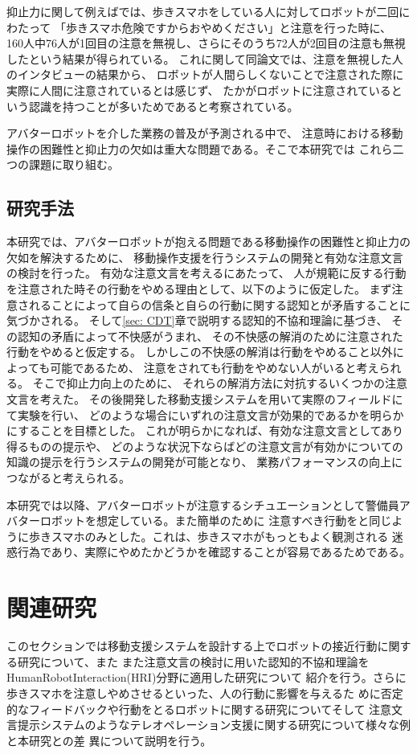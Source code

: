 \documentclass{kuisthesis}
\begin{document}
抑止力に関して例えば\cite{Schneider2022}では、歩きスマホをしている人に対してロボットが二回にわたって
「歩きスマホ危険ですからおやめください」と注意を行った時に、
160人中76人が1回目の注意を無視し、さらにそのうち72人が2回目の注意も無視したという結果が得られている。
これに関して同論文では、注意を無視した人のインタビューの結果から、
ロボットが人間らしくないことで注意された際に実際に人間に注意されているとは感じず、
たかがロボットに注意されているという認識を持つことが多いためであると考察されている。

アバターロボットを介した業務の普及が予測される中で、
注意時における移動操作の困難性と抑止力の欠如は重大な問題である。そこで本研究では
これら二つの課題に取り組む。


\subsection{研究手法}
\label{sec: 研究目的}
本研究では、アバターロボットが抱える問題である移動操作の困難性と抑止力の欠如を解決するために、
移動操作支援を行うシステムの開発と有効な注意文言の検討を行った。
有効な注意文言を考えるにあたって、
人が規範に反する行動を注意された時その行動をやめる理由として、以下のように仮定した。
まず注意されることによって自らの信条と自らの行動に関する認知とが矛盾することに気づかされる。
そして\ref{sec: CDT}章で説明する認知的不協和理論\cite{Festinger1957}に基づき、
その認知の矛盾によって不快感がうまれ、
その不快感の解消のために注意された行動をやめると仮定する。
しかしこの不快感の解消は行動をやめること以外によっても可能であるため、
注意をされても行動をやめない人がいると考えられる。
そこで抑止力向上のために、
それらの解消方法に対抗するいくつかの注意文言を考えた。
その後開発した移動支援システムを用いて実際のフィールドにて実験を行い、
どのような場合にいずれの注意文言が効果的であるかを明らかにすることを目標とした。
これが明らかになれば、有効な注意文言としてあり得るものの提示や、
どのような状況下ならばどの注意文言が有効かについての知識の提示を行うシステムの開発が可能となり、
業務パフォーマンスの向上につながると考えられる。


本研究では以降、アバターロボットが注意するシチュエーションとして警備員アバターロボットを想定している。また簡単のために
注意すべき行動を\cite{Schneider2022,Mizumaru2019}と同じように歩きスマホのみとした。これは、歩きスマホがもっともよく観測される
迷惑行為であり、実際にやめたかどうかを確認することが容易であるためである。



\section{関連研究}
このセクションでは移動支援システムを設計する上でロボットの接近行動に関する研究について、また
また注意文言の検討に用いた認知的不協和理論をHumanRobotInteraction(HRI)分野に適用した研究について
紹介を行う。さらに歩きスマホを注意しやめさせるといった、人の行動に影響を与えるた
めに否定的なフィードバックや行動をとるロボットに関する研究についてそして
注意文言提示システムのようなテレオペレーション支援に関する研究について様々な例と本研究との差
異について説明を行う。
\end{document}
